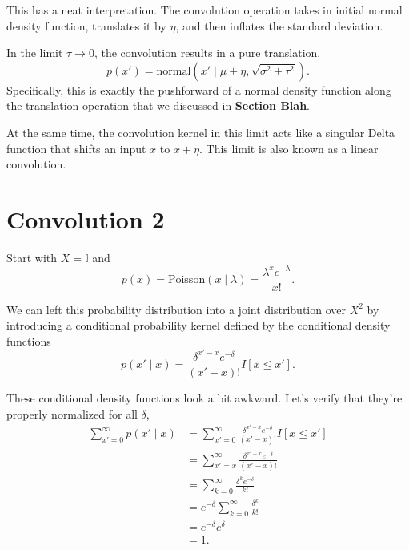 \documentclass[11pt, oneside]{article}
\begin{document}
This has a neat interpretation.  The convolution operation takes in initial 
normal density function, translates it by $\eta$, and then inflates the standard 
deviation.

In the limit $\tau \rightarrow 0$, the convolution results in a pure 
translation,
%
\begin{equation*}
p( x' ) 
=
\text{normal} \left( x' \mid \mu + \eta, \sqrt{ \sigma^{2} + \tau^{2} } \right).
\end{equation*}
%
Specifically, this is exactly the pushforward of a normal density function
along the translation operation that we discussed in \textbf{Section Blah}.


At the same time, the convolution kernel in this limit acts like a singular 
Delta function that shifts an input $x$ to $x + \eta$.  This limit is 
also known as a linear convolution.

\section{Convolution 2}

Start with $X = \mathbb{I}$ and
%
\begin{equation*}
p( x ) 
= \text{Poisson}( x \mid \lambda )
= \frac{ \lambda^{x} e^{-\lambda} }{ x! }.
\end{equation*}

We can left this probability distribution into a joint distribution 
over $X^{2}$ by introducing a conditional probability kernel defined
by the conditional density functions
%
\begin{equation*}
p( x' \mid x )
=
\frac{ \delta^{x' - x} e^{-\delta} }{ (x' - x)! } I[ x \le x' ].
\end{equation*}

These conditional density functions look a bit awkward.  Let's verify 
that they're properly normalized for all $\delta$,
%
\begin{align*}
\sum_{x' = 0}^{ \infty }
p( x' \mid x )
&=
\sum_{x' = 0}^{ \infty }
\frac{ \delta^{x' - x} e^{-\delta} }{ (x' - x)! } I[ x \le x' ]
\\
&=
\sum_{x' = x}^{ \infty }
\frac{ \delta^{x' - x} e^{-\delta} }{ (x' - x)! }
\\
&=
\sum_{k = 0}^{ \infty }
\frac{ \delta^{k} e^{-\delta} }{ k! }
\\
&=
e^{-\delta} 
\sum_{k = 0}^{ \infty }
\frac{ \delta^{k} }{ k! }
\\
&=
e^{-\delta} 
e^{\delta}
\\
&=
1.
\end{align*}
\end{document}
